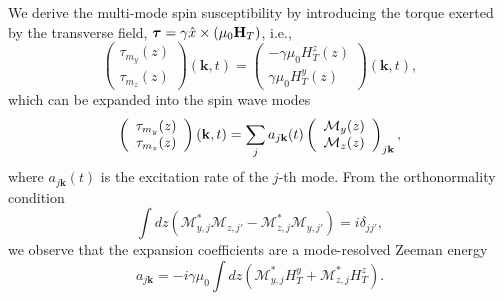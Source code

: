 \documentclass[aps,prb,twocolumn,superscriptaddress,floatfix]{revtex4}%
\def\taubold{\mbox{\boldmath $\tau$}}
\begin{document}
We derive the multi-mode spin susceptibility by introducing the torque exerted by the  transverse field, $\taubold=\gamma \hat x\times  (\mu_0 \mathbf H_T)$, i.e.,
\begin{equation}
\left(\begin{array}{c}
\tau_{m_{y}}(z)\\
\tau_{m_{z}}(z)
\end{array}\right)(\mathbf{k},t)=\left(\begin{array}{c}
-\gamma \mu_0 H_T^z(z)\\
\gamma \mu_0 H_T^y(z)
\end{array}\right)(\mathbf{k},t),
\label{eq:degeneration_rate}
\end{equation} 
which can be expanded into the spin wave modes
\begin{equation}
\left(\begin{array}{c}
\tau_{m_{y}}(z)\\
\tau_{m_{z}}(z)
\end{array}\right)(\mathbf{k},t)
=\sum_{j}a_{j\mathbf{k}}(t)\left(\begin{array}{c}
{\cal M}_{y}(z)\\
{\cal M}_{z}(z)
\end{array}\right)_{j\mathbf k},
\end{equation}
where $a_{j\mathbf{k}}(t)$ is the excitation rate of the $j$-th mode. From the orthonormality condition~\cite{Verba12}
\begin{equation}
\int dz (\mathcal M_{y,j}^\ast\mathcal M_{z,j'}-\mathcal M_{z,j}^\ast\mathcal M_{y,j'})=i\delta_{jj'}, \label{orthN}
\end{equation}
we observe that the expansion coefficients are a mode-resolved Zeeman energy
\begin{equation}
a_{j\mathbf k}=-i\gamma \mu_0 \int dz (\mathcal M_{y,j}^\ast H_{T}^y+\mathcal M_{z,j}^\ast H_T^z).
\end{equation}
\end{document}
